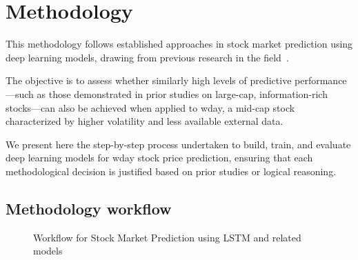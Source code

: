 \clearpage
\section{Methodology}

This methodology follows established approaches in stock market prediction using deep
learning models, drawing from previous research in the 
field~\parencite{parmar2018stock, nabipour2020DeepLearning,
chang2024StockPrediction,agrawal2022StockPrediction, shaban2024SMPDL}. 

The objective is to assess whether similarly high levels of predictive performance—such as those 
demonstrated in prior studies on large-cap, information-rich stocks—can also be achieved when applied to 
\acrshort{wday}, a mid-cap stock characterized by higher volatility and less available external data.

We present here the step-by-step process undertaken to build, train, and evaluate deep
learning models for \acrshort{wday} stock price prediction, ensuring that each methodological
decision is justified based on prior studies or logical reasoning.

\subsection{Methodology workflow}

\begin{figure}[H]
    \centering
    \caption{Workflow for Stock Market Prediction using LSTM and related models}
    \label{fig:modelwf}
\end{figure}

